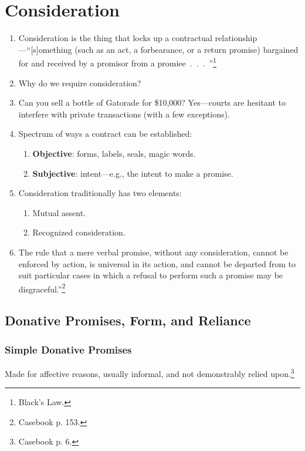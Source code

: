 \section{Consideration}

\begin{enumerate}
    \item Consideration is the thing that locks up a contractual 
    relationship---``[s]omething (such as an act, a forbearance, or a return 
    promise) bargained for and received by a promisor from a 
    promiee~.~.~.~''\footnote{Black's Law.}
    \item Why do we require consideration?
    \item Can you sell a bottle of Gatorade for \$10,000? Yes---courts are 
    hesitant to interfere with private transactions (with a few exceptions).
    \item Spectrum of ways a contract can be established:
    \begin{enumerate}
        \item \textbf{Objective}: forms, labels, seals, magic words.
        \item \textbf{Subjective}: intent---e.g., the intent to make a 
        promise.
    \end{enumerate}
    \item Consideration traditionally has two elements:
    \begin{enumerate}
        \item Mutual assent.
        \item Recognized consideration.
    \end{enumerate}
    \item The rule that a mere verbal promise, without any consideration, 
    cannot be enforced by action, is universal in its action, and cannot be 
    departed from to suit particular cases in which a refusal to perform such 
    a promise may be disgraceful.''\footnote{Casebook p. 153.}
\end{enumerate}

\subsection{Donative Promises, Form, and Reliance}

\subsubsection{Simple Donative Promises}

Made for affective reasons, usually informal, and not demonstrably relied 
upon.\footnote{Casebook p. 6.}

